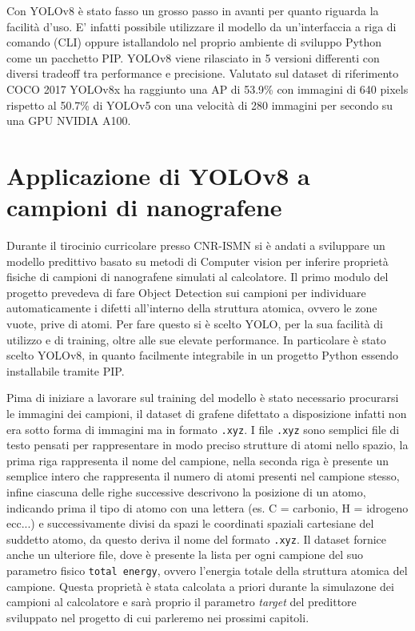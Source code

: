 \documentclass[12pt,a4paper,openright,twoside]{report}
\begin{document}
\newpage
Con YOLOv8 è stato fasso un grosso passo in avanti per quanto riguarda la facilità d'uso.
E' infatti possibile utilizzare il modello da un'interfaccia a riga di comando (CLI) oppure istallandolo nel proprio ambiente di sviluppo Python come un pacchetto PIP. 
YOLOv8 viene rilasciato in 5 versioni differenti con diversi tradeoff tra performance e precisione.
Valutato sul dataset di riferimento COCO 2017 YOLOv8x ha raggiunto una AP di 53.9\% con immagini di 640 pixels rispetto al 50.7\% di YOLOv5 con una velocità di 280 immagini per secondo su una GPU NVIDIA A100. 

\newpage
\section{Applicazione di YOLOv8 a campioni di nanografene}
Durante il tirocinio curricolare presso CNR-ISMN si è andati a sviluppare un modello predittivo basato su metodi di Computer vision per inferire proprietà fisiche di campioni di nanografene simulati al calcolatore. 
Il primo modulo del progetto prevedeva di fare Object Detection sui campioni per individuare automaticamente i difetti all'interno della struttura atomica, ovvero le zone vuote, prive di atomi. 
Per fare questo si è scelto YOLO, per la sua facilità di utilizzo e di training, oltre alle sue elevate performance. In particolare è stato scelto YOLOv8, in quanto facilmente integrabile in un progetto Python essendo installabile tramite PIP. 

Pima di iniziare a lavorare sul training del modello è stato necessario procurarsi le immagini dei campioni, il dataset di grafene difettato a disposizione infatti non era sotto forma di immagini ma in formato \texttt{.xyz}. I file \texttt{.xyz} sono semplici file di testo pensati per rappresentare in modo preciso strutture di atomi nello spazio, la prima riga rappresenta il nome del campione, nella seconda riga è presente un semplice intero che rappresenta il numero di atomi presenti nel campione stesso, infine ciascuna delle righe successive descrivono la posizione di un atomo, indicando prima il tipo di atomo con una lettera (es. C = carbonio, H = idrogeno ecc...) e successivamente divisi da spazi le coordinati spaziali cartesiane del suddetto atomo, da questo deriva il nome del formato \texttt{.xyz}. Il dataset fornice anche un ulteriore file, dove è presente la lista per ogni campione del suo parametro fisico \texttt{total energy}, ovvero l'energia totale della struttura atomica del campione. Questa proprietà è stata calcolata a priori durante la simulazone dei campioni al calcolatore e sarà proprio il parametro \emph{target} del predittore sviluppato nel progetto di cui parleremo nei prossimi capitoli. \newpage
\end{document}
